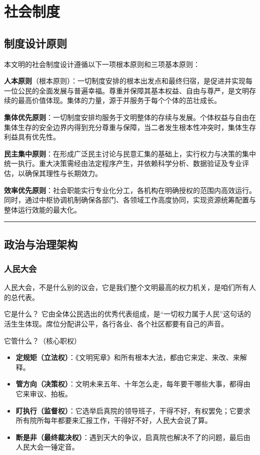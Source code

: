 \chapter{社会制度}\label{ux793eux4f1aux5236ux5ea6}

\section{制度设计原则}\label{ux5236ux5ea6ux8bbeux8ba1ux539fux5219}

本文明的社会制度设计遵循以下一项根本原则和三项基本原则：

\textbf{人本原则}（根本原则）：一切制度安排的根本出发点和最终归宿，是促进并实现每一位公民的全面发展与普遍幸福。尊重并保障其基本权益、自由与尊严，是文明存续的最高价值体现。集体的力量，源于并服务于每个个体的茁壮成长。

\textbf{集体优先原则}：一切制度安排均服务于文明整体的存续与发展。个体权益与自由在集体生存的安全边界内得到充分尊重与保障，当二者发生根本性冲突时，集体生存利益具有优先性。

\textbf{民主集中原则}：在形成广泛民主讨论与民意汇集的基础上，实行权力与决策的集中统一执行。重大决策需经由法定程序产生，并依赖科学分析、数据验证及专业评估，以确保其理性与长期效力。

\textbf{效率优先原则}：社会职能实行专业化分工，各机构在明确授权的范围内高效运行。同时，通过中枢协调机制确保各部门、各领域工作高度协同，实现资源统筹配置与整体运行效能的最大化。

\begin{center}\rule{0.5\linewidth}{0.5pt}\end{center}

\section{政治与治理架构}\label{ux653fux6cbbux4e0eux6cbbux7406ux67b6ux6784}

\subsection{人民大会}\label{ux4ebaux6c11ux5927ux4f1a}

人民大会，不是什么别的议会，它是我们整个文明最高的权力机关，是咱们所有人的总代表。

它是什么？ 它由全体公民选出的优秀代表组成，是``一切权力属于人民''这句话的活生生体现。席位分配讲公平，各行各业、各个社区都要有自己的声音。

它管什么？（核心职权）

\begin{itemize}
\item
  \textbf{定规矩（立法权）}：《文明宪章》和所有根本大法，都由它来定、来改、来解释。
\item
  \textbf{管方向（决策权）}：文明未来五年、十年怎么走，每年要干哪些大事，都得由它来审议、拍板。
\item
  \textbf{盯执行（监督权）}：它选举启真院的领导班子，干得不好，有权罢免；它要求所有院所每年都要来汇报工作，干得好不好，人民大会说了算。
\item
  \textbf{断是非（最终裁决权）}：遇到天大的争议，启真院也解决不了的问题，最后由人民大会一锤定音。
\end{itemize}


